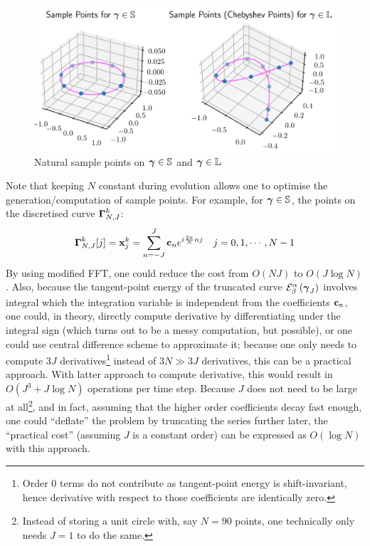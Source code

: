 \documentclass[../dissertation.tex]{subfiles}
\begin{document}
\begin{figure}[tbp]
    \centering
    \includegraphics[width=\textwidth]{sections/FourierSeriesImgs/SamplePointsOnCurves}
    \caption{Natural sample points on $\boldsymbol{\gamma} \in \mathbb{S}$ and $\boldsymbol{\gamma} \in \mathbb{L}$}
\end{figure}

Note that keeping $N$ constant during evolution allows one to optimise the generation/computation of sample points.
For example, for $\boldsymbol{\gamma} \in \mathbb{S}$, the points on the discretised curve $\boldsymbol{\Gamma}_{N,J}^k$:
\begin{align}
    \boldsymbol{\Gamma}_{N,J}^k [j] &= \mathbf{x}_{j}^{k} = \sum_{n=-J}^{J} \mathbf{c}_{n} e^{i \frac{2\pi}{N}n j} & j=0,1,\cdots,N-1
    \label{equ: DFT}
\end{align}
By using modified FFT\cite{5213896}, one could reduce the cost from $O\left( NJ \right)$ to $O \left( J \log N \right)$.
Also, because the tangent-point energy of the truncated curve $\mathcal{E}_{\beta}^{\alpha} \left( \boldsymbol{\gamma}_{J} \right)$ involves integral which the integration variable is independent from the coefficients $\mathbf{c}_n$,
one could, in theory, directly compute derivative by differentiating under the integral sign (which turns out to be a messy computation, but possible),
or one could use central difference scheme to approximate it;
because one only needs to compute $3J$ derivatives\footnote{Order $0$ terms do not contribute as tangent-point energy is shift-invariant, hence derivative with respect to those coefficients are identically zero.}
instead of $3N \gg 3J$ derivatives, this can be a practical approach.
With latter approach to compute derivative, this would result in $O\left( J^3 + J \log N \right)$ operations per time step.
Because $J$ does not need to be large at all\footnote{Instead of storing a unit circle with, say $N = 90$ points, one technically only needs $J=1$ to do the same.},
and in fact, assuming that the higher order coefficients decay fast enough,
one could ``deflate'' the problem by truncating the series further later,
the ``practical cost'' (assuming $J$ is a constant order) can be expressed as $O\left( \log N \right)$ with this approach.
\end{document}
